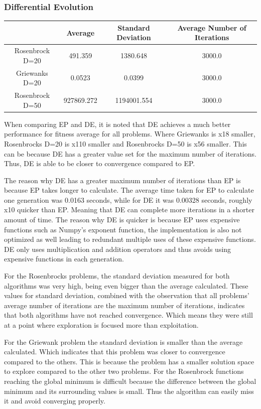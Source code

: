 \documentclass{article}
\begin{document}
\subsubsection*{Differential Evolution}
\begin{center}
	\begin{tabular}{|c|c|c|c|}
		\hline
		& Average & Standard Deviation & Average Number of Iterations \\
		\hline
		Rosenbrock D=20 & 491.359 & 1380.648 & 3000.0 \\
		\hline
		Griewanks D=20 & 0.0523 & 0.0399 & 3000.0 \\
		\hline
		Rosenbrock D=50 & 927869.272 & 1194001.554 & 3000.0 \\
		\hline
	\end{tabular}
\end{center}

When comparing EP and DE, it is noted that DE achieves a much better performance for fitness average for all problems. Where Griewanks is x18 smaller, Rosenbrocks D=20 is x110 smaller and Rosenbrocks D=50 is x56 smaller. This can be because DE has a greater value set for the maximum number of iterations. Thus, DE is able to be closer to convergence compared to EP. \par

\noindent The reason why DE has a greater maximum number of iterations than EP is because EP takes longer to calculate. The average time taken for EP to calculate one generation was 0.0163 seconds, while for DE it was 0.00328 seconds, roughly x10 quicker than EP. Meaning that DE can complete more iterations in a shorter amount of time. The reason why DE is quicker is because EP uses expensive functions such as Numpy’s exponent function, the implementation is also not optimized as well leading to redundant multiple uses of these expensive functions. DE only uses multiplication and addition operators and thus avoids using expensive functions in each generation.\par 

\noindent For the Rosenbrocks problems, the standard deviation measured for both algorithms was very high, being even bigger than the average calculated. These values for standard deviation, combined with the observation that all problems’ average number of iterations are the maximum number of iterations, indicates that both algorithms have not reached convergence. Which means they were still at a point where exploration is focused more than exploitation. \par
\noindent For the Griewank problem the standard deviation is smaller than the average calculated. Which indicates that this problem was closer to convergence compared to the others. This is because the problem has a smaller solution space to explore compared to the other two problems. For the Rosenbrock functions reaching the global minimum is difficult because the difference between the global minimum and its surrounding values is small. Thus the algorithm can easily miss it and avoid converging properly. \par
\end{document}

